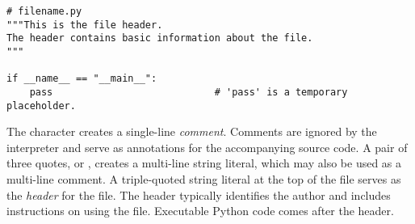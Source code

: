\begin{lstlisting}
# filename.py
"""This is the file header.
The header contains basic information about the file.
"""

if __name__ == "__main__":
    pass                            # 'pass' is a temporary placeholder.
\end{lstlisting}

The \li{#} character creates a single-line \emph{comment}.
Comments are ignored by the interpreter and serve as annotations for the accompanying source code.
A pair of three quotes,  or , creates a multi-line string literal, which may also be used as a multi-line comment.
A triple-quoted string literal at the top of the file serves as the \emph{header} for the file.
The header typically identifies the author and includes instructions on using the file.
Executable Python code comes after the header.


